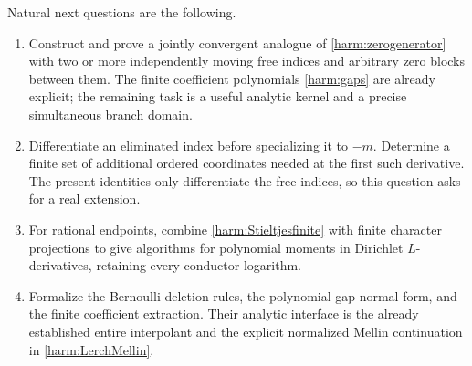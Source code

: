 Natural next questions are the following.
\begin{enumerate}
\item Construct and prove a jointly convergent analogue of
\eqref{harm:zerogenerator} with two or more independently moving free
indices and arbitrary zero blocks between them. The finite coefficient
polynomials \eqref{harm:gaps} are already explicit; the remaining task
is a useful analytic kernel and a precise simultaneous branch domain.
\item Differentiate an eliminated index before specializing it to
$-m$. Determine a finite set of additional ordered coordinates needed
at the first such derivative. The present identities only differentiate
the free indices, so this question asks for a real extension.
\item For rational endpoints, combine \eqref{harm:Stieltjesfinite}
with finite character projections to give algorithms for polynomial
moments in Dirichlet $L$-derivatives, retaining every conductor logarithm.
\item Formalize the Bernoulli deletion rules, the polynomial gap
normal form, and the finite coefficient extraction. Their analytic
interface is the already established entire interpolant and the
explicit normalized Mellin continuation in \eqref{harm:LerchMellin}.
\end{enumerate}
